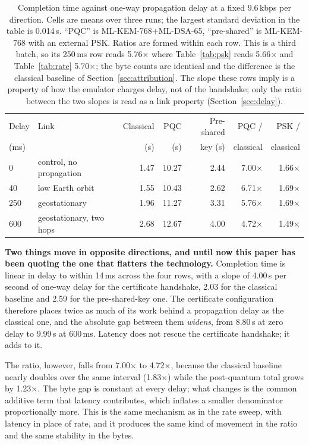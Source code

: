 \documentclass[drones,article,submit,pdftex,moreauthors]{Definitions/mdpi}
\newcommand{\kbps}{kbps}
\newcommand{\mlkem}{ML-KEM}
\newcommand{\mldsa}{ML-DSA}
\begin{document}
\begin{table}[H]
\caption{Completion time against one-way propagation delay at a fixed
9.6\,\kbps{} per direction. Cells are means over three runs; the largest
standard deviation in the table is 0.014\,s. ``PQC'' is
\mlkem{}-768$+$\mldsa{}-65, ``pre-shared'' is \mlkem{}-768 with an
external PSK. Ratios are formed within each row. This is a third batch,
so its 250\,ms row reads 5.76$\times$ where Table~\ref{tab:psk} reads
5.66$\times$ and Table~\ref{tab:rate} 5.70$\times$; the byte counts are
identical and the difference is the classical baseline of
Section~\ref{sec:attribution}. The slope these rows imply is a property
of how the emulator charges delay, not of the handshake; only the ratio
between the two slopes is read as a link property
(Section~\ref{sec:delay}).}
\label{tab:delay}
\centering
\small
\begin{tabular}{llrrrrr}
\toprule
Delay & Link & Classical & PQC & Pre-shared & PQC / & PSK / \\
(ms) & & (s) & (s) & key (s) & classical & classical \\
\midrule
0   & control, no propagation & 1.47  & 10.27 & 2.44 & 7.00$\times$ & 1.66$\times$ \\
40  & low Earth orbit         & 1.55  & 10.43 & 2.62 & 6.71$\times$ & 1.69$\times$ \\
250 & geostationary           & 1.96  & 11.27 & 3.31 & 5.76$\times$ & 1.69$\times$ \\
600 & geostationary, two hops & 2.68  & 12.67 & 4.00 & 4.72$\times$ & 1.49$\times$ \\
\bottomrule
\end{tabular}
\end{table}

\textbf{Two things move in opposite directions, and until now this
paper has been quoting the one that flatters the technology.} Completion time is linear in delay to
within 14\,ms across the four rows, with a slope of 4.00\,s per second
of one-way delay for the certificate handshake, 2.03 for the classical
baseline and 2.59 for the pre-shared-key one. The certificate
configuration therefore places twice as much of its work behind a
propagation delay as the classical one, and the absolute gap between
them \emph{widens}, from 8.80\,s at zero delay to 9.99\,s at 600\,ms.
Latency does not rescue the certificate handshake; it adds to it.

The ratio, however, falls from 7.00$\times$ to 4.72$\times$, because the
classical baseline nearly doubles over the same interval (1.83$\times$)
while the post-quantum total grows by 1.23$\times$. The byte gap is
constant at every delay; what changes is the common additive term that
latency contributes, which inflates a smaller denominator
proportionally more. This is the same mechanism as in the rate sweep,
with latency in place of rate, and it produces the same kind of
movement in the ratio and the same stability in the bytes.
\end{document}
